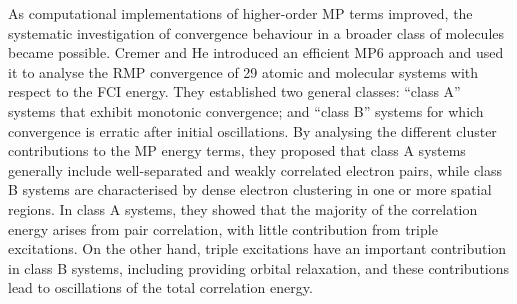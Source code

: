 \documentclass[aps,prb,reprint,noshowkeys,superscriptaddress]{revtex4-1}
\begin{document}
As computational implementations of higher-order MP terms improved, the systematic investigation 
of convergence behaviour in a broader class of molecules became possible.
Cremer and He introduced an efficient MP6 approach and used it to analyse the RMP convergence of
29 atomic and molecular systems with respect to the FCI energy.\cite{Cremer_1996}
They established two general classes: ``class A'' systems that exhibit monotonic convergence; 
and ``class B'' systems for which convergence is erratic after initial oscillations. 
By analysing the different cluster contributions to the MP energy terms, they proposed that
class A systems generally include well-separated and weakly correlated electron pairs, while class B systems
are characterised by dense electron clustering in one or more spatial regions.\cite{Cremer_1996}
In class A systems, they showed that the majority of the correlation energy arises from pair correlation, 
with little contribution from triple excitations.
On the other hand, triple excitations have an important contribution in class B systems, including providing
orbital relaxation, and these contributions lead to oscillations of the total correlation energy.
\end{document}
